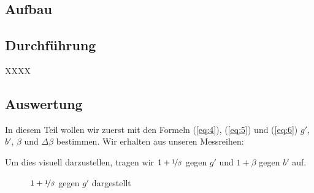\documentclass[11pt,a4paper]{article}
\newcommand{\halftime}[4]{\begin{figure}[h]
\begin{minipage}{.#1\textwidth}#3\end{minipage}\begin{minipage}{.#2\textwidth}
\centering
#4\end{minipage}
\end{figure}}
\begin{document}
\subsection{Aufbau}



\subsection{Durchführung}

XXXX

\subsection{Auswertung}

In diesem Teil wollen wir zuerst mit den Formeln (\ref{eq:4}), (\ref{eq:5}) und (\ref{eq:6}) $g'$, $b'$, $\beta$ und $\Delta \beta$ bestimmen. Wir erhalten aus unseren Messreihen:

Um dies visuell darzustellen, tragen wir $1+\nicefrac{1}{\beta}$ gegen $g'$ und $1+\beta$ gegen $b'$ auf.

\begin{figure}[h]
\centering
{}
\renewcommand\thefigure{69}
\caption[$1+\nicefrac{1}{\beta}$ gegen $g'$ dargestellt]{$1+\nicefrac{1}{\beta}$ gegen $g'$ dargestellt}
\label{Abb:g}
\end{figure}
\end{document}
